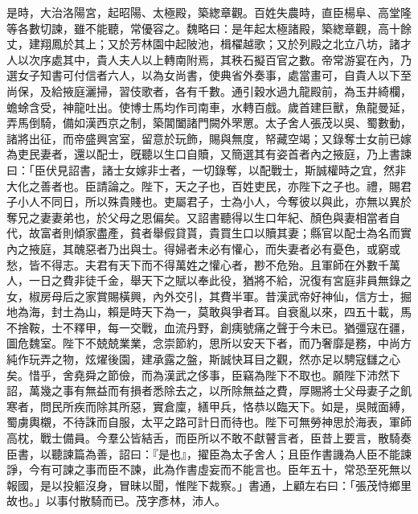 \begin{pinyinscope}
是時，大治洛陽宮，起昭陽、太極殿，築緫章觀。百姓失農時，直臣楊阜、高堂隆等各數切諫，雖不能聽，常優容之。魏略曰：是年起太極諸殿，築緫章觀，高十餘丈，建翔鳳於其上；又於芳林園中起陂池，楫櫂越歌；又於列殿之北立八坊，諸才人以次序處其中，貴人夫人以上轉南附焉，其秩石擬百官之數。帝常游宴在內，乃選女子知書可付信者六人，以為女尚書，使典省外奏事，處當畫可，自貴人以下至尚保，及給掖庭灑掃，習伎歌者，各有千數。通引穀水過九龍殿前，為玉井綺欄，蟾蜍含受，神龍吐出。使博士馬均作司南車，水轉百戲。歲首建巨獸，魚龍曼延，弄馬倒騎，備如漢西京之制，築閶闔諸門闕外罘罳。太子舍人張茂以吳、蜀數動，諸將出征，而帝盛興宮室，留意於玩飾，賜與無度，帑藏空竭；又錄奪士女前已嫁為吏民妻者，還以配士，旣聽以生口自贖，又簡選其有姿首者內之掖庭，乃上書諫曰：「臣伏見詔書，諸士女嫁非士者，一切錄奪，以配戰士，斯誠權時之宜，然非大化之善者也。臣請論之。陛下，天之子也，百姓吏民，亦陛下之子也。禮，賜君子小人不同日，所以殊貴賤也。吏屬君子，士為小人，今奪彼以與此，亦無以異於奪兄之妻妻弟也，於父母之恩偏矣。又詔書聽得以生口年紀、顏色與妻相當者自代，故富者則傾家盡產，貧者舉假貸貰，貴買生口以贖其妻；縣官以配士為名而實內之掖庭，其醜惡者乃出與士。得婦者未必有懽心，而失妻者必有憂色，或窮或愁，皆不得志。夫君有天下而不得萬姓之懽心者，尠不危殆。且軍師在外數千萬人，一日之費非徒千金，舉天下之賦以奉此役，猶將不給，況復有宮庭非員無錄之女，椒房母后之家賞賜橫興，內外交引，其費半軍。昔漢武帝好神仙，信方士，掘地為海，封土為山，賴是時天下為一，莫敢與爭者耳。自衰亂以來，四五十載，馬不捨鞍，士不釋甲，每一交戰，血流丹野，創痍號痛之聲于今未已。猶彊寇在疆，圖危魏室。陛下不兢兢業業，念崇節約，思所以安天下者，而乃奢靡是務，中尚方純作玩弄之物，炫燿後園，建承露之盤，斯誠快耳目之觀，然亦足以騁寇讎之心矣。惜乎，舍堯舜之節儉，而為漢武之侈事，臣竊為陛下不取也。願陛下沛然下詔，萬幾之事有無益而有損者悉除去之，以所除無益之費，厚賜將士父母妻子之飢寒者，問民所疾而除其所惡，實倉廩，繕甲兵，恪恭以臨天下。如是，吳賊面縛，蜀虜輿櫬，不待誅而自服，太平之路可計日而待也。陛下可無勞神思於海表，軍師高枕，戰士備員。今羣公皆結舌，而臣所以不敢不獻瞽言者，臣昔上要言，散騎奏臣書，以聽諫篇為善，詔曰：『是也』，擢臣為太子舍人；且臣作書譏為人臣不能諫諍，今有可諫之事而臣不諫，此為作書虛妄而不能言也。臣年五十，常恐至死無以報國，是以投軀沒身，冒昧以聞，惟陛下裁察。」書通，上顧左右曰：「張茂恃鄉里故也。」以事付散騎而已。茂字彥林，沛人。


\end{pinyinscope}
